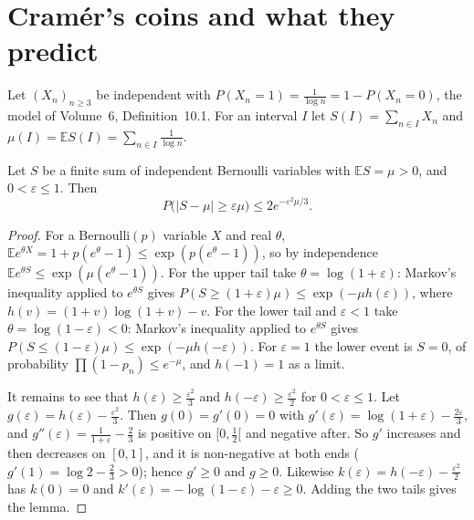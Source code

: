 \section{Cram\'er's coins and what they predict}\label{sec:cramercoins}

Let $(X_n)_{n\ge3}$ be independent with $P(X_n=1)=\frac1{\log n}=1-P(X_n=0)$, the model of Volume~6, Definition~10.1. For an interval $I$ let $S(I)=\sum_{n\in I}X_n$ and $\mu(I)=\mathbb ES(I)=\sum_{n\in I}\frac1{\log n}$.

\begin{lemma}\label{lem:chernoffcoins}
Let $S$ be a finite sum of independent Bernoulli variables with $\mathbb ES=\mu>0$, and $0<\varepsilon\le1$. Then
\[
P\bigl(|S-\mu|\ge\varepsilon\mu\bigr)\le2e^{-\varepsilon^2\mu/3}.
\]
\end{lemma}
\begin{proof}
For a Bernoulli$(p)$ variable $X$ and real $\theta$, $\mathbb Ee^{\theta X}=1+p(e^\theta-1)\le\exp(p(e^\theta-1))$, so by independence $\mathbb Ee^{\theta S}\le\exp(\mu(e^\theta-1))$. For the upper tail take $\theta=\log(1+\varepsilon)$: Markov's inequality applied to $e^{\theta S}$ gives $P(S\ge(1+\varepsilon)\mu)\le\exp(-\mu h(\varepsilon))$, where $h(v)=(1+v)\log(1+v)-v$. For the lower tail and $\varepsilon<1$ take $\theta=\log(1-\varepsilon)<0$: Markov's inequality applied to $e^{\theta S}$ gives $P(S\le(1-\varepsilon)\mu)\le\exp(-\mu h(-\varepsilon))$. For $\varepsilon=1$ the lower event is $S=0$, of probability $\prod(1-p_n)\le e^{-\mu}$, and $h(-1)=1$ as a limit.

It remains to see that $h(\varepsilon)\ge\frac{\varepsilon^2}3$ and $h(-\varepsilon)\ge\frac{\varepsilon^2}2$ for $0<\varepsilon\le1$. Let $g(\varepsilon)=h(\varepsilon)-\frac{\varepsilon^2}3$. Then $g(0)=g'(0)=0$ with $g'(\varepsilon)=\log(1+\varepsilon)-\frac{2\varepsilon}3$, and $g''(\varepsilon)=\frac1{1+\varepsilon}-\frac23$ is positive on $[0,\frac12[$ and negative after. So $g'$ increases and then decreases on $[0,1]$, and it is non-negative at both ends ($g'(1)=\log2-\frac23>0$); hence $g'\ge0$ and $g\ge0$. Likewise $k(\varepsilon)=h(-\varepsilon)-\frac{\varepsilon^2}2$ has $k(0)=0$ and $k'(\varepsilon)=-\log(1-\varepsilon)-\varepsilon\ge0$. Adding the two tails gives the lemma.
\end{proof}

